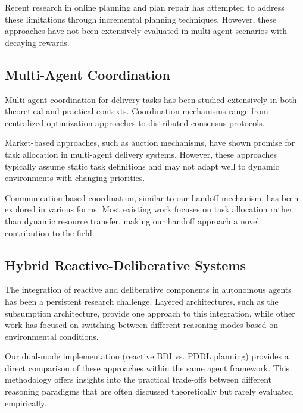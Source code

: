 Recent research in online planning and plan repair has attempted to address these limitations through incremental planning techniques. However, these approaches have not been extensively evaluated in multi-agent scenarios with decaying rewards.

\subsection{Multi-Agent Coordination}

Multi-agent coordination for delivery tasks has been studied extensively in both theoretical and practical contexts. Coordination mechanisms range from centralized optimization approaches to distributed consensus protocols.

Market-based approaches, such as auction mechanisms, have shown promise for task allocation in multi-agent delivery systems. However, these approaches typically assume static task definitions and may not adapt well to dynamic environments with changing priorities.

Communication-based coordination, similar to our handoff mechanism, has been explored in various forms. Most existing work focuses on task allocation rather than dynamic resource transfer, making our handoff approach a novel contribution to the field.

\subsection{Hybrid Reactive-Deliberative Systems}

The integration of reactive and deliberative components in autonomous agents has been a persistent research challenge. Layered architectures, such as the subsumption architecture, provide one approach to this integration, while other work has focused on switching between different reasoning modes based on environmental conditions.

Our dual-mode implementation (reactive BDI vs. PDDL planning) provides a direct comparison of these approaches within the same agent framework. This methodology offers insights into the practical trade-offs between different reasoning paradigms that are often discussed theoretically but rarely evaluated empirically.
